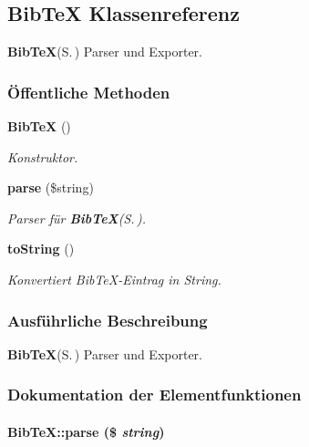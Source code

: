 \subsection{Bib\-Te\-X Klassenreferenz}
\label{classBibTeX}
{\bf Bib\-Te\-X}{\rm (S.\,\pageref{classBibTeX})} Parser und Exporter.  


\subsubsection*{\"{O}ffentliche Methoden}
\begin{CompactItemize}
\item 
{\bf Bib\-Te\-X} ()\label{classBibTeX_8f5bb42a792203a05dd14a55cd8e0fb3}

\begin{CompactList}\small\item\em Konstruktor. \item\end{CompactList}\item 
{\bf parse} (\$string)
\begin{CompactList}\small\item\em Parser für {\bf Bib\-Te\-X}{\rm (S.\,\pageref{classBibTeX})}. \item\end{CompactList}\item 
{\bf to\-String} ()
\begin{CompactList}\small\item\em Konvertiert Bib\-Te\-X-Eintrag in String. \item\end{CompactList}\end{CompactItemize}


\subsubsection{Ausf\"{u}hrliche Beschreibung}
{\bf Bib\-Te\-X}{\rm (S.\,\pageref{classBibTeX})} Parser und Exporter. 



\subsubsection{Dokumentation der Elementfunktionen}
\paragraph{\setlength{\rightskip}{0pt plus 5cm}Bib\-Te\-X::parse (\$ {\em string})}\hfill\label{classBibTeX_0fcfbb98f28eb1700cd6877116dc57f6}



